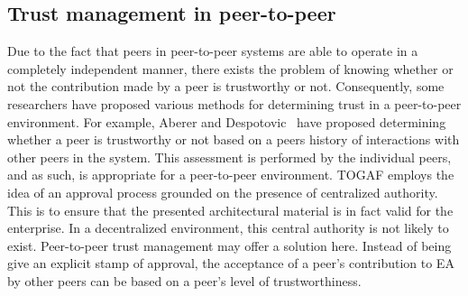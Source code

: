 \subsection{Trust management in peer-to-peer}
%
%
Due to the fact that peers in peer-to-peer systems are able to operate in a completely independent manner, there exists the problem of knowing whether or not the contribution made by a peer is trustworthy or not. Consequently, some researchers have proposed various methods for determining trust in a peer-to-peer environment.
%
%
For example, Aberer and Despotovic~\cite{aberer2001managing} have proposed determining whether a peer is trustworthy or not based on a peers history of interactions with other peers in the system. This assessment is performed by the individual peers, and as such, is appropriate for a peer-to-peer environment.
%
%
TOGAF employs the idea of an approval process grounded on the presence of centralized authority. This is to ensure that the presented architectural material is in fact valid for the enterprise. In a decentralized environment, this central authority is not likely to exist. Peer-to-peer trust management may offer a solution here. Instead of being give an explicit stamp of approval, the acceptance of a peer's contribution to EA by other peers can be based on a peer's level of trustworthiness. 
%
%






%
%
%
%
%

